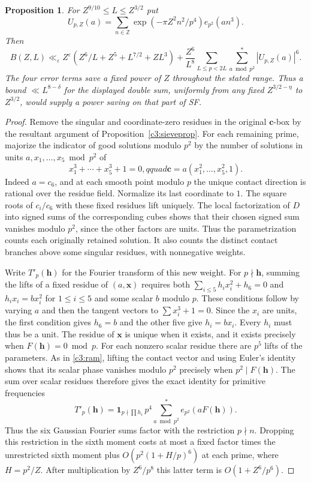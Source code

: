 \documentclass[11pt,letterpaper]{article}
\newtheorem{proposition}[proposition]{Proposition}
\theoremstyle{definition}
\begin{document}
\begin{proposition}\label{c3:contact}
For $Z^{9/10}\le L\le Z^{3/2}$ put
\[
 U_{p,Z}(a)=\sum_{n\in\mathbb Z}\exp(-\pi Z^2 n^2/p^4)e_{p^2}(an^3).
\]
Then
\[
 B(Z,L)\ll_\varepsilon Z^\varepsilon
       (Z^6/L+Z^5+L^{7/2}+ZL^3)
       +\frac{Z^6}{L^8}
         \sum_{L\le p<2L}\sum_{a\bmod p^2}^{*}|U_{p,Z}(a)|^6 .
\]
The four error terms save a fixed power of $Z$ throughout the stated
range. Thus a bound $\ll L^{8-\delta}$ for the displayed double sum,
uniformly from any fixed $Z^{3/2-\eta}$ to $Z^{3/2}$, would supply a
power saving on that part of SF.
\end{proposition}
\begin{proof}
Remove the singular and coordinate-zero residues in the original
$\mathbf c$-box by the resultant argument of
Proposition~\ref{c3:sieveprop}. For each remaining prime, majorize the
indicator of good solutions modulo $p^2$ by the number of solutions
in units $a,x_1,\ldots,x_5\bmod p^2$ of
\[
 x_1^3+\cdots+x_5^3+1=0,qquad
 \mathbf c=a(x_1^2,\ldots,x_5^2,1).
\]
Indeed $a=c_6$, and at each smooth point modulo $p$ the unique contact
direction is rational over the residue field. Normalize its last
coordinate to $1$. The square roots of $c_i/c_6$ with these fixed
residues lift uniquely. The local factorization of $D$ into signed sums
of the corresponding cubes shows that their chosen signed sum vanishes
modulo $p^2$, since the other factors are units. Thus the parametrization
counts each originally retained solution. It also counts the distinct
contact branches above some singular residues, with nonnegative weights.

Write $T'_p(\mathbf h)$ for the Fourier transform of this new weight.
For $p\nmid\mathbf h$, summing the lifts of a fixed residue of $(a,\mathbf x)$
requires both
$\sum_{i\le5}h_i x_i^2+h_6=0$ and
$h_i x_i=b x_i^2$ for $1\le i\le5$ and some scalar $b$ modulo $p$.
These conditions follow by varying $a$ and then the tangent vectors to
$\sum x_i^3+1=0$. Since the $x_i$ are units, the first condition gives
$h_6=b$ and the other five give $h_i=b x_i$. Every $h_i$ must thus
be a unit. The residue of $\mathbf x$ is unique when it exists, and
it exists precisely when $F(\mathbf h)=0\bmod p$. For each nonzero
scalar residue there are $p^5$ lifts of the parameters. As in
\eqref{c3:ram}, lifting the contact vector and using Euler's identity
shows that its scalar phase vanishes modulo $p^2$ precisely when
$p^2\mid F(\mathbf h)$. The sum over scalar residues therefore gives
the exact identity for primitive frequencies
\[
 T'_p(\mathbf h)=\mathbf1_{p\nmid\prod h_i}\,p^4
                     \sum_{a\bmod p^2}^{*}e_{p^2}(aF(\mathbf h)).
\]
Thus the six Gaussian Fourier sums factor with the restriction $p\nmid n$.
Dropping this restriction in the sixth moment costs at most a fixed
factor times the unrestricted sixth moment plus
$O(p^2(1+H/p)^6)$ at each prime, where $H=p^2/Z$. After multiplication
by $Z^6/p^8$ this latter term is $O(1+Z^6/p^6)$.


\end{proof}
\end{document}
